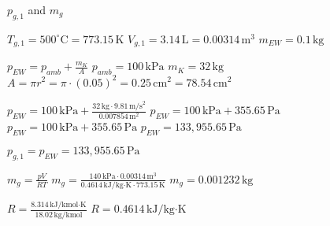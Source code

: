 \( p_{g,1} \) and \( m_g \)

\( T_{g,1} = 500^\circ \text{C} = 773.15 \, \text{K} \)  
\( V_{g,1} = 3.14 \, \text{L} = 0.00314 \, \text{m}^3 \)  
\( m_{EW} = 0.1 \, \text{kg} \)  

\( p_{EW} = p_{amb} + \frac{m_K}{A} \)  
\( p_{amb} = 100 \, \text{kPa} \)  
\( m_K = 32 \, \text{kg} \)  
\( A = \pi r^2 = \pi \cdot (0.05)^2 = 0.25 \, \text{cm}^2 = 78.54 \, \text{cm}^2 \)  

\( p_{EW} = 100 \, \text{kPa} + \frac{32 \, \text{kg} \cdot 9.81 \, \text{m/s}^2}{0.007854 \, \text{m}^2} \)  
\( p_{EW} = 100 \, \text{kPa} + 355.65 \, \text{Pa} \)  
\( p_{EW} = 100 \, \text{kPa} + 355.65 \, \text{Pa} \)  
\( p_{EW} = 133,955.65 \, \text{Pa} \)  

\( p_{g,1} = p_{EW} = 133,955.65 \, \text{Pa} \)  

\( m_g = \frac{pV}{RT} \)  
\( m_g = \frac{140 \, \text{kPa} \cdot 0.00314 \, \text{m}^3}{0.4614 \, \text{kJ/kg·K} \cdot 773.15 \, \text{K}} \)  
\( m_g = 0.001232 \, \text{kg} \)  

\( R = \frac{8.314 \, \text{kJ/kmol·K}}{18.02 \, \text{kg/kmol}} \)  
\( R = 0.4614 \, \text{kJ/kg·K} \)